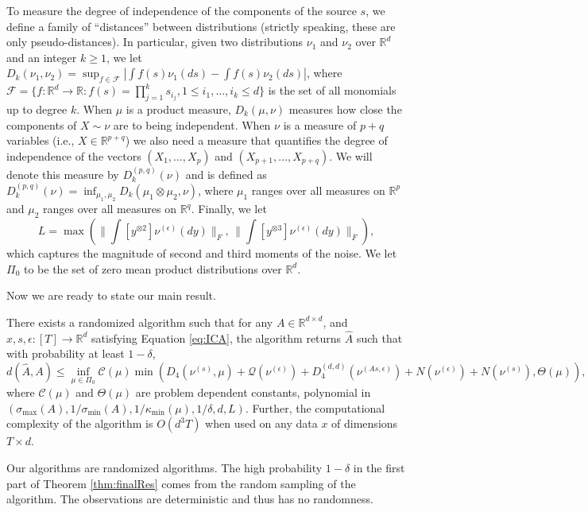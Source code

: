 \documentclass[twoside,11pt]{article}
\newcommand{\real}{\mathbb{R}}
\newcommand{\cQ}{\mathcal{Q}}
\newcommand{\eps}{\epsilon}
\begin{document}
To measure the degree of independence of the components of the source $s$, we define
a family of ``distances'' between distributions (strictly speaking, these are only pseudo-distances).
In particular, given two distributions $\nu_1$ and $\nu_2$ over $\real^d$ and an integer $k\ge 1$, we
let $D_k(\nu_1,\nu_2) = \sup_{f\in\mathcal{F}} |\int f(s)\nu_1(ds) - \int f(s)\nu_2(ds)|$, 
where $\mathcal{F}=\{f:\real^d \to \real : f(s)=\prod_{j=1}^k s_{i_j}, 1 \le i_1,\ldots,i_k \le d\}$ 
is the set of all monomials up to degree $k$.
When $\mu$ is a product measure, $D_k(\mu,\nu)$ measures how close the components of $X\sim \nu$ are to being independent.
When $\nu$ is a measure of $p+q$ variables (i.e., $X\in \real^{p+q}$) 
we also need a measure that quantifies the degree of independence of the vectors $(X_1,\dots,X_p)$ and $(X_{p+1},\dots,X_{p+q})$. We will denote this measure by $D_k^{(p,q)}(\nu)$ and is defined as $D_k^{(p,q)} (\nu)= \inf_{\mu_1,\mu_2} D_k(\mu_1\otimes \mu_2,\nu)$, where $\mu_1$ ranges over all measures on $\real^p$ and $\mu_2$ ranges over all measures on $\real^q$. 
Finally, we let 
\[
L = \max \left( \| \textstyle\int  [y^{\otimes 2}] \nu^{(\epsilon)}(dy) \|_F,\, 
			  \| \int  [y^{\otimes 3}] \nu^{(\epsilon)}(dy) \|_F \right),
\]
which captures the magnitude of second and third moments of the noise.
We let $\Pi_0$ to be the set of zero mean product distributions over $\real^d$.

Now we are ready to state our main result. 
\begin{theorem}
\label{thm:finalRes} 
There exists a randomized algorithm such that 
for any $A\in \real^{d\times d}$, and $x, s, \epsilon: [T] \rightarrow \real^d$ satisfying Equation \eqref{eq:ICA},
the algorithm returns $\hat{A}$
such that with probability at least $1-\delta$,
\[
d(\hat{A}, A) \le
\inf_{\mu\in \Pi_0} \mathcal{C}(\mu) \min\left(D_4(\nu^{(s)},\mu)+ \cQ(\nu^{(\eps)}) + D_4^{(d,d)}(\nu^{(As,\eps)})
+N(\nu^{(\eps)}) + N( \nu^{(s)}), \Theta(\mu) \right),
\]
where $\mathcal{C}(\mu)$ and $\Theta(\mu)$ are problem dependent constants, polynomial in $(\sigma_{\max}(A), 1/\sigma_{\min}(A), 1/\kappa_{\min}(\mu),1/\delta, d, L)$.
Further, the computational complexity of the algorithm is $O(d^3 T)$ when used on any data $x$ of dimensions $T\times d$.
\end{theorem}
\begin{remark}
Our algorithms are randomized algorithms. The high probability $1-\delta$ in the first part of Theorem \ref{thm:finalRes} comes from the random sampling of the algorithm. The observations are deterministic and thus has no randomness. 
\end{remark}
\end{document}
